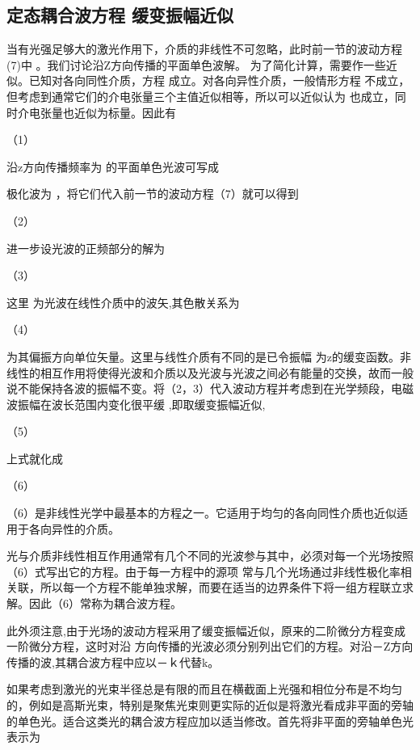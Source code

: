 \subsection{定态耦合波方程    缓变振幅近似}
   当有光强足够大的激光作用下，介质的非线性不可忽略，此时前一节的波动方程(7)中  。我们讨论沿Z方向传播的平面单色波解。 为了简化计算，需要作一些近似。已知对各向同性介质，方程 成立。对各向异性介质，一般情形方程 不成立，但考虑到通常它们的介电张量三个主值近似相等，所以可以近似认为 也成立，同时介电张量也近似为标量。因此有

                                    （1）

沿z方向传播频率为 的平面单色光波可写成


极化波为  ，将它们代入前一节的波动方程（7）就可以得到

                   （2）       

进一步设光波的正频部分的解为

                                          （3）          

这里 为光波在线性介质中的波矢,其色散关系为

                                             （4）

 为其偏振方向单位矢量。这里与线性介质有不同的是已令振幅  为z的缓变函数。非线性的相互作用将使得光波和介质以及光波与光波之间必有能量的交换，故而一般说不能保持各波的振幅不变。将（2，3）代入波动方程并考虑到在光学频段，电磁波振幅在波长范围内变化很平缓 ,即取缓变振幅近似, 

                                   （5）     

上式就化成

                               （6）             

（6）是非线性光学中最基本的方程之一。它适用于均匀的各向同性介质也近似适用于各向异性的介质。

光与介质非线性相互作用通常有几个不同的光波参与其中，必须对每一个光场按照（6）式写出它的方程。由于每一方程中的源项 常与几个光场通过非线性极化率相关联，所以每一个方程不能单独求解，而要在适当的边界条件下将一组方程联立求解。因此（6）常称为耦合波方程。

此外须注意,由于光场的波动方程采用了缓变振幅近似，原来的二阶微分方程变成一阶微分方程，这时对沿 方向传播的光波必须分别列出它们的方程。对沿－Z方向传播的波,其耦合波方程中应以－ｋ代替k。

如果考虑到激光的光束半径总是有限的而且在横截面上光强和相位分布是不均匀的，例如是高斯光束，特别是聚焦光束则更实际的近似是将激光看成非平面的旁轴的单色光。适合这类光的耦合波方程应加以适当修改。首先将非平面的旁轴单色光表示为

